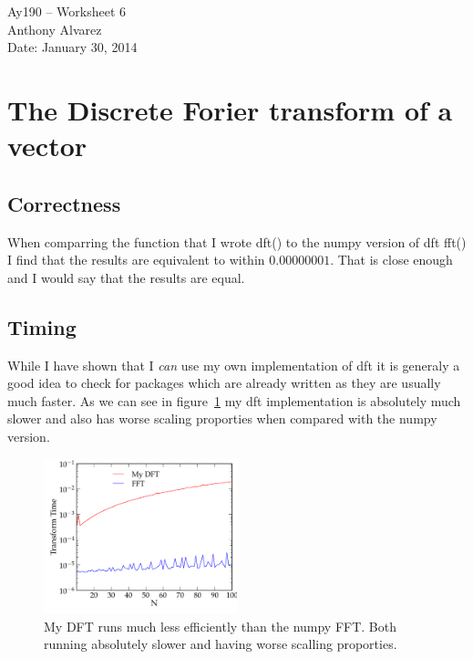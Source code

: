 \documentclass[11pt,letterpaper]{article}
\begin{document}
\begin{center}
\Large
Ay190 -- Worksheet 6\\
Anthony Alvarez\\
Date: January 30, 2014
\end{center}

\section{The Discrete Forier transform of a vector }
\subsection{Correctness}

When comparring the function that I wrote dft() to the numpy version of dft 
fft() I find that the results are equivalent to within $0.00000001$. That is 
close enough and I would say that the results are equal.

\subsection{Timing}

While I have shown that I \textit{can} use my own implementation of dft
it is generaly a good idea to check for packages which are already written
as they are usually much faster. As we can see in figure~\ref{fig:dft} my dft
implementation is absolutely much slower and also has worse scaling proporties
when compared with the numpy version. 

\begin{figure}[bth]
\centering
\includegraphics[width=0.5\textwidth]{1b.pdf}
\caption{My DFT runs much less efficiently than the numpy FFT. Both running 
absolutely slower and having worse scalling proporties.}
\label{fig:dft}
\end{figure}
\end{document}
